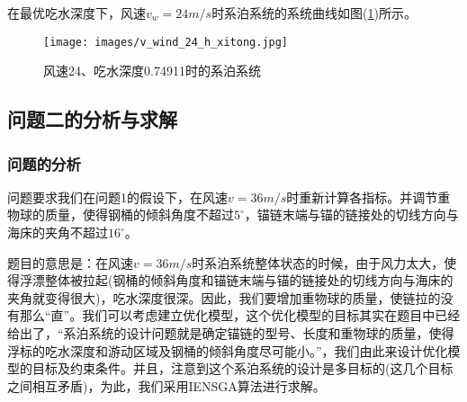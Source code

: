             在最优吃水深度下，风速$v_w=24m/s$时系泊系统的系统曲线如图(\ref{风速24、吃水深度0.74911时的系泊系统})所示。
            \begin{figure}[H]
                \centering
                \texttt{[image: images/v\_wind\_24\_h\_xitong.jpg]}
                \caption{风速24、吃水深度0.74911时的系泊系统}
                \label{风速24、吃水深度0.74911时的系泊系统}
            \end{figure}


    \subsection{问题二的分析与求解}
        \subsubsection{问题的分析}
            \par
            问题要求我们在问题1的假设下，在风速$v=36m/s$时重新计算各指标。并调节重物球的质量，使得钢桶的倾斜角度不超过$5^\circ$，锚链末端与锚的链接处的切线方向与海床的夹角不超过$16^\circ$。
            \par
            题目的意思是：在风速$v=36m/s$时系泊系统整体状态的时候，由于风力太大，使得浮漂整体被拉起(钢桶的倾斜角度和锚链末端与锚的链接处的切线方向与海床的夹角就变得很大)，吃水深度很深。因此，我们要增加重物球的质量，使链拉的没有那么“直”。我们可以考虑建立优化模型，这个优化模型的目标其实在题目中已经给出了，“系泊系统的设计问题就是确定锚链的型号、长度和重物球的质量，使得浮标的吃水深度和游动区域及钢桶的倾斜角度尽可能小。”，我们由此来设计优化模型的目标及约束条件。并且，注意到这个系泊系统的设计是多目标的(这几个目标之间相互矛盾)，为此，我们采用IENSGA算法进行求解。


